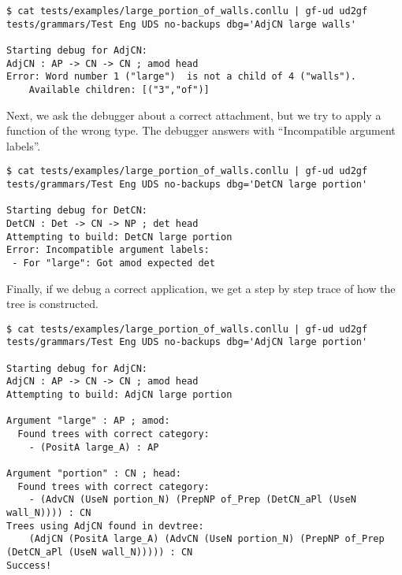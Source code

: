 \begin{lstlisting}
$ cat tests/examples/large_portion_of_walls.conllu | gf-ud ud2gf tests/grammars/Test Eng UDS no-backups dbg='AdjCN large walls'

Starting debug for AdjCN:
AdjCN : AP -> CN -> CN ; amod head
Error: Word number 1 ("large")  is not a child of 4 ("walls").
    Available children: [("3","of")]
\end{lstlisting}

Next, we ask the debugger about a correct attachment, but we try to apply a function of the wrong type. The debugger answers with ``Incompatible argument labels''.


\begin{lstlisting}
$ cat tests/examples/large_portion_of_walls.conllu | gf-ud ud2gf tests/grammars/Test Eng UDS no-backups dbg='DetCN large portion'

Starting debug for DetCN:
DetCN : Det -> CN -> NP ; det head
Attempting to build: DetCN large portion
Error: Incompatible argument labels:
 - For "large": Got amod expected det
\end{lstlisting}

Finally, if we debug a correct application, we get a step by step trace of how the tree is constructed.

\begin{lstlisting}
$ cat tests/examples/large_portion_of_walls.conllu | gf-ud ud2gf tests/grammars/Test Eng UDS no-backups dbg='AdjCN large portion'

Starting debug for AdjCN:
AdjCN : AP -> CN -> CN ; amod head
Attempting to build: AdjCN large portion

Argument "large" : AP ; amod:
  Found trees with correct category:
    - (PositA large_A) : AP

Argument "portion" : CN ; head:
  Found trees with correct category:
    - (AdvCN (UseN portion_N) (PrepNP of_Prep (DetCN_aPl (UseN wall_N)))) : CN
Trees using AdjCN found in devtree:
    (AdjCN (PositA large_A) (AdvCN (UseN portion_N) (PrepNP of_Prep (DetCN_aPl (UseN wall_N))))) : CN
Success!
\end{lstlisting}



